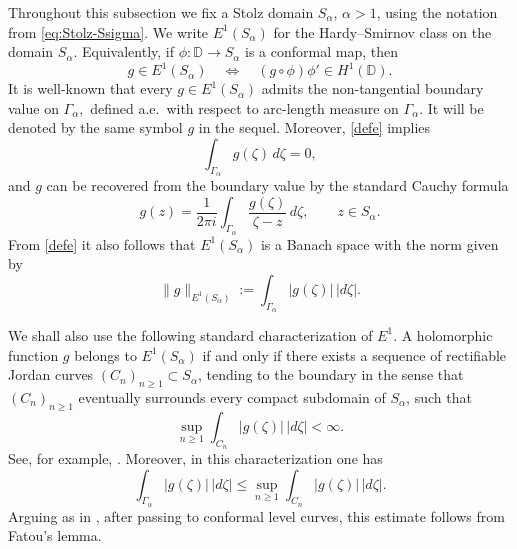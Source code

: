 \documentclass[11pt]{amsart}
\numberwithin{equation}{section}
\theoremstyle{definition}
\theoremstyle{plain}
\def\D{\mathbb{D}}
\begin{document}
Throughout this subsection we fix a Stolz domain \(S_\alpha\),
\(\alpha>1\), using the notation from \eqref{eq:Stolz-Ssigma}.  We write
\(E^1(S_\alpha)\) for the Hardy--Smirnov class on the 
domain \(S_\alpha\).  Equivalently, if \(\phi:\D\to S_\alpha\)
 is a
conformal map, then
\begin{equation}\label{defe}
        g\in E^1(S_\alpha)
        \quad\Longleftrightarrow\quad
        (g\circ\phi)\phi'\in H^1(\D).
\end{equation}
It is well-known that every $g \in E^1(S_\alpha)$ admits
the non-tangential boundary value on $\Gamma_\alpha,$ defined a.e.\ with respect to arc-length
measure on $\Gamma_\alpha.$ It will be denoted by the same symbol $g$ in the sequel.
Moreover, \eqref{defe} implies
\begin{equation}\label{ezero}
\int_{\Gamma_\alpha} g(\zeta)\, d\zeta=0, 
\end{equation}
and $g$ can be recovered from the boundary value by the standard Cauchy formula
\begin{equation}\label{cauchy}
g(z)=\frac{1}{2\pi i} \int_{\Gamma_\alpha}\frac{g(\zeta)}{\zeta-z}\, d\zeta, \qquad z \in S_\alpha.
\end{equation}
From \eqref{defe} it also follows that $E^1(S_\alpha)$ is a Banach space with the
norm given by
\[
        \|g\|_{E^1(S_\alpha)}
        :=
        \int_{\Gamma_\alpha}|g(\zeta)|\,|d\zeta|.
\]


We shall also use the following standard characterization of \(E^1\).  A
holomorphic function \(g\) belongs to \(E^1(S_\alpha)\) if and only if there
exists a sequence of rectifiable Jordan curves \((C_n)_{n \ge 1}\subset S_\alpha\), tending
to the boundary in the sense that \((C_n)_{n \ge 1}\) eventually surrounds every compact
subdomain of \(S_\alpha\), such that
\[
        \sup_{n\ge 1}\int_{C_n}|g(\zeta)|\,|d\zeta|<\infty.
\]
See, for example, \cite[Chapter~10]{Duren}.
Moreover, in this characterization one has
\begin{equation}\label{bounde}
        \int_{\Gamma_\alpha}|g(\zeta)|\,|d\zeta|
        \le
        \sup_{n\ge1}\int_{C_n}|g(\zeta)|\,|d\zeta|.
\end{equation}
Arguing as in \cite[Chapter 10]{Duren}, after passing to conformal
level curves, this estimate follows from Fatou's lemma.
\end{document}

